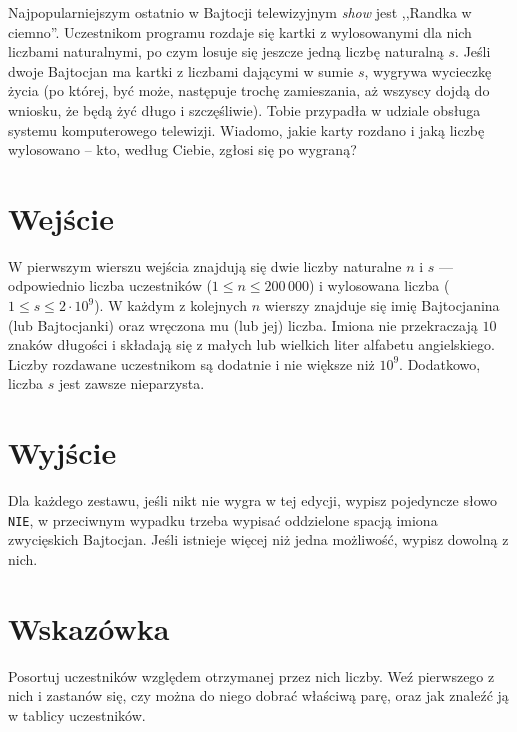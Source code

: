 \documentclass{spiral-kurs}
\begin{document}
\makeheader
%
    Najpopularniejszym ostatnio w Bajtocji telewizyjnym \textit{show} jest ,,Randka w ciemno''. Uczestnikom programu rozdaje się kartki z wylosowanymi dla nich liczbami naturalnymi, po czym losuje się jeszcze jedną liczbę naturalną $s$.
    Jeśli dwoje Bajtocjan ma kartki z liczbami dającymi w sumie $s$,
    wygrywa wycieczkę życia (po której, być może, następuje trochę zamieszania, aż wszyscy dojdą do wniosku, że będą żyć długo i szczęśliwie).
    Tobie przypadła w udziale obsługa systemu komputerowego telewizji. Wiadomo, jakie karty rozdano i jaką liczbę wylosowano -- kto, według Ciebie, zgłosi się po wygraną?

    \section{Wejście}
    W pierwszym wierszu wejścia znajdują się dwie liczby naturalne $n$ i $s$ --- odpowiednio liczba uczestników ($1 \leq n \leq 200\,000$) i wylosowana liczba ($1 \leq s \leq 2\cdot 10^9$).
    W każdym z kolejnych $n$ wierszy znajduje się imię Bajtocjanina (lub Bajtocjanki) oraz wręczona mu (lub jej) liczba. Imiona nie przekraczają $10$ znaków długości i składają się z małych lub wielkich liter alfabetu angielskiego.
    Liczby rozdawane uczestnikom są dodatnie i nie większe niż $10^9$. Dodatkowo, liczba $s$ jest zawsze nieparzysta.
    \section{Wyjście}
    Dla każdego zestawu, jeśli nikt nie wygra w tej edycji, wypisz pojedyncze słowo \texttt{NIE}, w przeciwnym wypadku trzeba wypisać oddzielone spacją imiona zwycięskich Bajtocjan. Jeśli istnieje więcej niż jedna możliwość, wypisz dowolną z nich.
    \section{Wskazówka}
    Posortuj uczestników względem otrzymanej przez nich liczby. Weź pierwszego z nich i zastanów się, czy można do niego dobrać właściwą parę, oraz jak znaleźć ją w tablicy uczestników.

  
\end{document}
